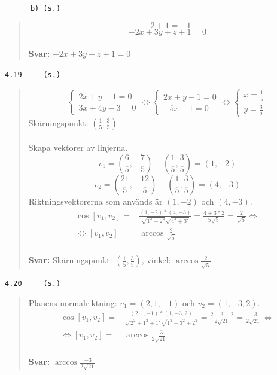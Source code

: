 \documentclass[a4paper]{article}
\newcommand{\tskcol}[1]{\textcolor{tskcol}{#1}}
\begin{document}
\texttt{\tskcol{~~~~~~b) (s.)}}
\begin{quotation}
	\noindent
	\[-2+1=-1\]
	\[-2x+3y+z+1=0\]
	\\
	\textbf{Svar:} $-2x+3y+z+1=0$
\end{quotation}

\texttt{\tskcol{4.19~~~~ (s.)}}
\begin{quotation}
	\noindent
	\[\begin{cases}
	2x+y-1=0 \\
	3x+4y-3=0
	\end{cases} \Leftrightarrow
	\begin{cases}
	2x+y-1=0 \\
	-5x+1=0
	\end{cases} \Leftrightarrow
	\begin{cases}
	x=\frac{1}{5} \\
	y=\frac{3}{5}
	\end{cases}\]
	Skärningspunkt: $(\frac{1}{5}, \frac{3}{5})$
	\\ \\
	Skapa vektorer av linjerna.
	\[v_1=(\frac{6}{5},-\frac{7}{5})-(\frac{1}{5}, \frac{3}{5})=(1,-2)\]
	\[v_2=(\frac{21}{5}, -\frac{12}{5})-(\frac{1}{5}, \frac{3}{5})=(4,-3)\]
	Riktningsvektorerna som används är $(1,-2)$ och $(4,-3)$.
	\begin{align*}
	\cos[v_1,v_2]=&
	\frac{(1,-2)*(4,-3)}{\sqrt{1^2+2^2}\sqrt{4^2+3^2}}=
	\frac{4+3*2}{5\sqrt{5}}=
	\frac{2}{\sqrt{5}} \Leftrightarrow \\ \Leftrightarrow
	[v_1,v_2]=&\arccos\frac{2}{\sqrt{5}}
	\end{align*}
	\\
	\textbf{Svar:} Skärningspunkt: $(\frac{1}{5}, \frac{3}{5})$, vinkel: $\arccos\frac{2}{\sqrt{5}}$
\end{quotation}

\texttt{\tskcol{4.20~~~~ (s.)}}
\begin{quotation}
	\noindent
	Planens normalriktning: $v_1=(2,1,-1)$ och $v_2=(1,-3,2)$.
	\begin{align*}
	\cos[v_1,v_2]=&
	\frac{(2,1,-1)*(1,-3,2)}{\sqrt{2^2+1^2+1^2}\sqrt{1^2+3^2+2^2}}=
	\frac{2-3-2}{2\sqrt{21}}=
	\frac{-3}{2\sqrt{21}} \Leftrightarrow \\ \Leftrightarrow
	[v_1,v_2]=&\arccos\frac{-3}{2\sqrt{21}}
	\end{align*}
	\\
	\textbf{Svar:} $\arccos\frac{-3}{2\sqrt{21}}$
\end{quotation}
\end{document}
